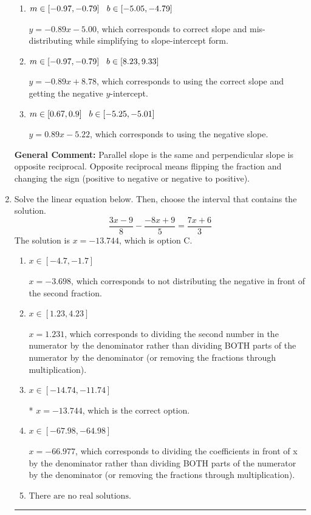 \documentclass{extbook}[14pt]
\newcommand{\litem}[1]{\item #1

\rule{\textwidth}{0.4pt}}
\begin{document}
\begin{enumerate}
{\begin{enumerate}[label=\Alph*.]
* $y = -0.89x - 8.78$, which is the correct option.
\item \( m \in [-0.97, -0.79] \hspace*{3mm} b \in [-5.05, -4.79] \)

 $y = -0.89x - 5.00$, which corresponds to correct slope and mis-distributing while simplifying to slope-intercept form.
\item \( m \in [-0.97, -0.79] \hspace*{3mm} b \in [8.23, 9.33] \)

 $y = -0.89x + 8.78$, which corresponds to using the correct slope and getting the negative $y$-intercept.
\item \( m \in [0.67, 0.9] \hspace*{3mm} b \in [-5.25, -5.01] \)

 $y = 0.89x - 5.22$, which corresponds to using the negative slope.
\end{enumerate}

\textbf{General Comment:} Parallel slope is the same and perpendicular slope is opposite reciprocal. Opposite reciprocal means flipping the fraction and changing the sign (positive to negative or negative to positive).
}
\litem{
Solve the linear equation below. Then, choose the interval that contains the solution.
\[ \frac{3x -9}{8} - \frac{-8x + 9}{5} = \frac{7x + 6}{3} \]The solution is \( x = -13.744 \), which is option C.\begin{enumerate}[label=\Alph*.]
\item \( x \in [-4.7, -1.7] \)

 $x = -3.698$, which corresponds to not distributing the negative in front of the second fraction.
\item \( x \in [1.23, 4.23] \)

 $x = 1.231$, which corresponds to dividing the second number in the numerator by the denominator rather than dividing BOTH parts of the numerator by the denominator (or removing the fractions through multiplication).
\item \( x \in [-14.74, -11.74] \)

* $x = -13.744$, which is the correct option.
\item \( x \in [-67.98, -64.98] \)

 $x = -66.977$, which corresponds to dividing the coefficients in front of x by the denominator rather than dividing BOTH parts of the numerator by the denominator (or removing the fractions through multiplication).
\item \( \text{There are no real solutions.} \)


\end{enumerate}}
\end{enumerate}
\end{document}
